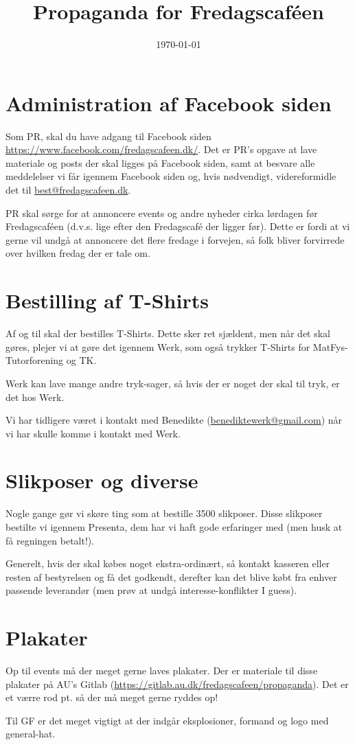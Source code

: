

\title{Propaganda for Fredagscaféen}
\date{\today}



\maketitle

\section{Administration af Facebook siden}
Som PR, skal du have adgang til Facebook siden \url{https://www.facebook.com/fredagscafeen.dk/}. Det er PR's opgave at lave materiale og posts der skal ligges på Facebook siden, samt at besvare alle meddelelser vi får igennem Facebook siden og, hvis nødvendigt, videreformidle det til \url{best@fredagscafeen.dk}.

PR skal sørge for at annoncere events og andre nyheder cirka lørdagen før Fredagscaféen (d.v.s. lige efter den Fredagscafé der ligger før). Dette er fordi at vi gerne vil undgå at annoncere det flere fredage i forvejen, så folk bliver forvirrede over hvilken fredag der er tale om.

\section{Bestilling af T-Shirts}
Af og til skal der bestilles T-Shirts. Dette sker ret sjældent, men når det skal gøres, plejer vi at gøre det igennem Werk, som også trykker T-Shirts for MatFys-Tutorforening og TK.

Werk kan lave mange andre tryk-sager, så hvis der er noget der skal til tryk, er det hos Werk.

Vi har tidligere været i kontakt med Benedikte (\url{benediktewerk@gmail.com}) når vi har skulle komme i kontakt med Werk.

\section{Slikposer og diverse}
Nogle gange gør vi skøre ting som at bestille 3500 slikposer. Disse slikposer bestilte vi igennem Presenta, dem har vi haft gode erfaringer med (men husk at få regningen betalt!).

Generelt, hvis der skal købes noget ekstra-ordinært, så kontakt kasseren eller resten af bestyrelsen og få det godkendt, derefter kan det blive købt fra enhver passende leverandør (men prøv at undgå interesse-konflikter I guess).

\section{Plakater}
Op til events må der meget gerne laves plakater. Der er materiale til disse plakater på AU's Gitlab (\url{https://gitlab.au.dk/fredagscafeen/propaganda}). Det er et værre rod pt. så der må meget gerne ryddes op!

Til GF er det meget vigtigt at der indgår eksplosioner, formand og logo med general-hat.


